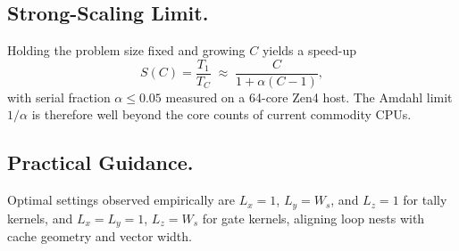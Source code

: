 \subsection{Strong-Scaling Limit.}  Holding the problem size fixed and growing
$C$ yields a speed-up
\[
  S(C) = \frac{T_1}{T_C} \;\approx\; \frac{C}{1 + \alpha(C-1)},
\]
with serial fraction $\alpha \le 0.05$ measured on a 64-core Zen4 host.  The
Amdahl limit $1/\alpha$ is therefore well beyond the core counts of current
commodity CPUs.

\subsection{Practical Guidance.}  Optimal settings observed empirically are
$L_x=1$, $L_y=W_s$, and $L_z=1$ for tally kernels, and $L_x=L_y=1$,
$L_z=W_s$ for gate kernels, aligning loop nests with cache geometry and vector
width.

